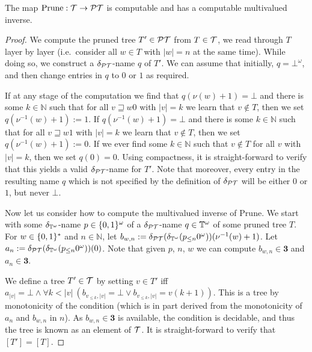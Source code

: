 \documentclass{eptcs-modified}
\begin{document}
\begin{theorem}
\label{theo:prunedtrees}
The map $\textrm{Prune} : \mathcal{T} \to \mathcal{PT}$ is computable and has a computable multivalued inverse.
\begin{proof}
We compute the pruned tree $T' \in \mathcal{PT}$ from $T \in \mathcal{T}$, we read through $T$ layer by layer (i.e.~consider all $w \in T$ with $|w| = n$ at the same time).
 While doing so, we construct a $\delta_{\mathcal{PT}}$-name $q$ of $T'$. We can assume that initially, $q = \bot^\omega$, and then change entries in $q$ to $0$ or $1$ as required.

If at any stage of the computation we find that $q(\nu(w)+1) = \bot$ and there is some $k \in \mathbb{N}$ such that for all $v \sqsupseteq w0$ with $|v| = k$ we learn that $v \notin T$, then we set $q(\nu^{-1}(w)+1) := 1$. If $q(\nu^{-1}(w)+1) = \bot$ and there is some $k \in \mathbb{N}$ such that for all $v \sqsupseteq w1$ with $|v| = k$ we learn that $v \notin T$, then we set $q(\nu^{-1}(w)+1) := 0$. If we ever find some $k \in \mathbb{N}$ such that $v \notin T$ for all $v$ with $|v| = k$, then we set $q(0) = 0$. Using compactness, it is straight-forward to verify that this yields a valid $\delta_{\mathcal{PT}}$-name for $T'$. Note that moreover, every entry in the resulting name $q$ which is not specified by the definition of $\delta_{\mathcal{PT}}$ will be either $0$ or $1$, but never $\bot$.

Now let us consider how to compute the multivalued inverse of $\textrm{Prune}$. We start with some $\delta_{\mathbb{T}^\omega}$-name $p \in \{0,1\}^\omega$
of a $\delta_{\mathcal{PT}}$-name $q \in \mathbb{T}^\omega$
of some pruned tree $T$. For $w \in \{0,1\}^*$ and $n \in \mathbb{N}$, let $b_{w,n} := \delta_{\mathcal{PT}}(\delta_{\mathbb{T}^\omega}(p_{\leq n}0^\omega))(\nu^{-1}(w)+1)$. Let $a_n := \delta_{\mathcal{PT}}(\delta_{\mathbb{T}^\omega}(p_{\leq n}0^\omega))(0)$. Note that given $p$, $n$, $w$ we can compute $b_{w,n} \in \mathbf{3}$ and $a_n \in \mathbf{3}$.

We define a tree $T' \in \mathcal{T}$ by setting $v \in T'$ iff $a_{|v|} = \bot \wedge \forall k < |v| \ ( b_{v_{\leq k}, |v|} = \bot \vee b_{v_{\leq k}, |v|} = v(k+1) )$. This is a tree by monotonicity of the condition (which is in part derived from the monotonicity of $a_n$ and $b_{w,n}$ in $n$). As $b_{w,n} \in \mathbf{3}$ is available, the condition is decidable, and thus the tree is known as an element of $\mathcal{T}$. It is straight-forward to verify that $[T'] = [T]$.
\end{proof}
\end{theorem}
\end{document}
